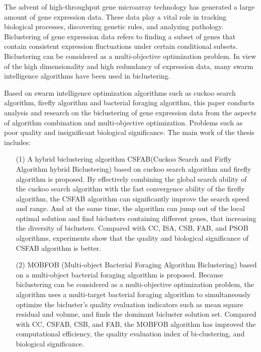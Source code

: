 \begin{eabstract}
  The advent of high-throughput gene microarray technology has generated a large amount of gene expression data. These data play a vital role in tracking biological processes, discovering genetic rules, and analyzing pathology. Biclustering of gene expression data refers to finding a subset of genes that contain consistent expression fluctuations under certain conditional subsets. Biclustering can be considered as a multi-objective optimization problem. In view of the high dimensionality and high redundancy of expression data, many swarm intelligence algorithms have been used in biclustering.

  Based on swarm intelligence optimization algorithms such as cuckoo search algorithm, firefly algorithm and bacterial foraging algorithm, this paper conducts analysis and research on the biclustering of gene expression data from the aspects of algorithm combination and multi-objective optimization. Problems such as poor quality and insignificant biological significance. The main work of the thesis includes:
  
  \begin{itemize}
    \item[(1)] {  A hybrid biclustering algorithm CSFAB(Cuckoo Search and Firfly Algorithm hybrid Biclustering) based on cuckoo search algorithm and firefly algorithm is proposed. By effectively combining the global search ability of the cuckoo search algorithm with the fast convergence ability of the firefly algorithm, the CSFAB algorithm can significantly improve the search speed and range. And at the same time, the algorithm can jump out of the local optimal solution and find biclusters containing different genes, that increasing the diversity of biclusters. Compared with CC, ISA, CSB, FAB, and PSOB algorithms, experiments show that the quality and biological significance of CSFAB algorithm is better.}
    \item[(2)] { MOBFOB (Multi-object Bacterial Foraging Algorithm Biclustering) based on a multi-object bacterial foraging algorithm is proposed. Because biclustering can be considered as a multi-objective optimization problem, the algorithm uses a multi-target bacterial foraging algorithm to simultaneously optimize the bicluster's quality evaluation indicators such as mean square residual and volume, and finds the dominant bicluster solution set. Compared with CC, CSFAB, CSB, and FAB, the MOBFOB algorithm has improved the computational efficiency, the quality evaluation index of bi-clustering, and biological significance.}
  \end{itemize}




\end{eabstract}